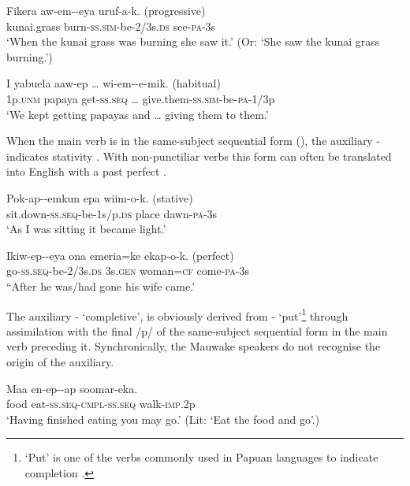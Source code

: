 \ea%
\label{ex:3:x339}
\gll Fikera aw-em--eya uruf-a-k. (progressive) \\
kunai.grass burn-\textsc{ss}.\textsc{sim}-be-2/3s.\textsc{ds} see-\textsc{pa}-3s \\
\glt`When the kunai grass was burning she saw it.' (Or: `She saw the kunai grass burning.')
\z

\ea%
\label{ex:3:x340}
\gll I yabuela aaw-ep {\dots} wi-em--e-mik. (habitual) \\
1p.\textsc{unm} papaya get-\textsc{ss}.\textsc{seq} {\dots} give.them-\textsc{ss}.\textsc{sim}-be-\textsc{pa}-1/3p \\
\glt`We kept getting papayas and {\dots} giving them to them.'
\z

When the main verb is in the same-subject sequential form (), the auxiliary - indicates stativity . With non-punctiliar verbs this form can often be translated into English with a past perfect .

\ea%
\label{ex:3:x341}
\gll Pok-ap--emkun epa wiim-o-k. (stative) \\
sit.down-\textsc{ss}.\textsc{seq}-be-1s/p.\textsc{ds} place dawn-\textsc{pa}-3s \\
\glt`As I was sitting it became light.'
\z

\ea%
\label{ex:3:x342}
\gll Ikiw-ep--eya ona emeria=ke ekap-o-k. (perfect) \\
go-\textsc{ss}.\textsc{seq}-be-2/3s.\textsc{ds} 3s.\textsc{gen} woman=\textsc{cf} come-\textsc{pa}-3s \\
\glt``After he was/had gone his wife came.'
\z

The auxiliary - `completive', is obviously derived from - `put'\footnote{`Put' is one of the verbs commonly used in Papuan languages to indicate completion \citep[145]{Foley1986}.} through assimilation with the final /p/ of the same-subject sequential form in the main verb preceding it. Synchronically, the Mauwake speakers do not recognise the origin of the auxiliary.

\ea%
\label{ex:3:x343}
\gll Maa en-ep--ap soomar-eka. \\
food eat-\textsc{ss}.\textsc{seq}-\textsc{cmpl}-\textsc{ss}.\textsc{seq} walk-\textsc{imp}.2p \\
\glt`Having finished eating you may go.' (Lit: `Eat the food and go'.)
\z

